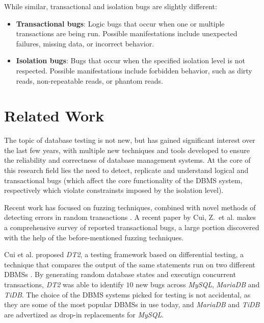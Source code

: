 While similar, transactional and isolation bugs are slightly different:
\begin{itemize}
    \item \textbf{Transactional bugs}: Logic bugs that occur when one or multiple transactions are being run. Possible manifestations include unexpected failures, missing data, or incorrect behavior.
    \item \textbf{Isolation bugs}: Bugs that occur when the specified isolation level is not respected. Possible manifestations include forbidden behavior, such as dirty reads, non-repeatable reads, or phantom reads.
\end{itemize}

\section{Related Work}

The topic of database testing is not new, but has gained significant interest over the last few years, with multiple new techniques and tools developed to ensure the reliability and correctness of database management systems. At the core of this research field lies the need to detect, replicate and understand logical and transactional bugs (which affect the core functionality of the DBMS system, respectively which violate constrainsts imposed by the isolation level).

Recent work has focused on fuzzing techniques, combined with novel methods of detecting errors in random transactions \cite{jiang2023detecting, cui2022differentially_ASE2022, dou2023detecting_ICSE2023, clark2024validating}. A recent paper by Cui, Z.\ et al. \cite{cui2024understanding_ICSE2024} makes a comprehensive survey of reported transactional bugs, a large portion discovered with the help of the before-mentioned fuzzing techniques.

Cui et al. proposed \textit{DT2}, a testing framework based on differential testing, a technique that compares the output of the same statements run on two different DBMSs \cite{cui2022differentially_ASE2022}. By generating random database states and executign concurrent transactions, \textit{DT2} was able to identify $10$ new bugs across \textit{MySQL}, \textit{MariaDB} and \textit{TiDB}. The choice of the DBMS systems picked for testing is not accidental, as they are some of the most popular DBMSs in use today, and \textit{MariaDB} and \textit{TiDB} are advertized as drop-in replacements for \textit{MySQL}.


